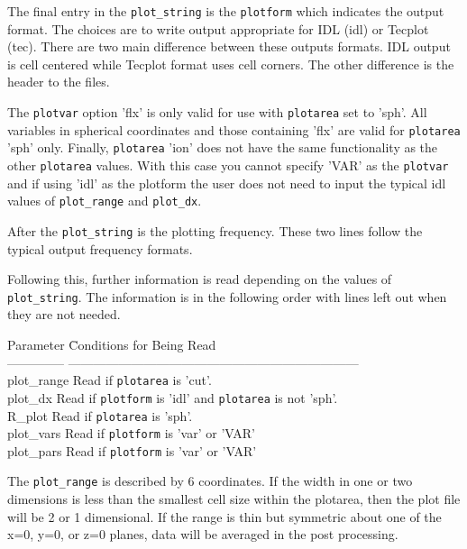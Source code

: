 The final entry in the {\tt plot\_string} is the {\tt plotform}
which indicates the output format.
The choices are to write output appropriate for IDL (idl) or Tecplot (tec).
There are two main difference between these outputs formats. IDL output is
cell centered while Tecplot format uses cell corners.  The
other difference is the header to the files.

The {\tt plotvar} option 'flx' is only valid for use with 
{\tt plotarea} set to 'sph'.  All variables in spherical 
coordinates and those containing 'flx' are valid for {\tt plotarea} 'sph' only.
Finally, {\tt plotarea} 'ion' does not have the same functionality as the other
{\tt plotarea} values.  With this case you cannot specify 'VAR' as the 
{\tt plotvar} and if using 'idl' as the plotform the user does not need to
input the typical idl values of {\tt plot\_range} and {\tt plot\_dx}.

After the {\tt plot\_string} is the plotting frequency.  These two lines
follow the typical output frequency formats.

Following this, further information is read depending on the values of 
{\tt plot\_string}.  The information is in the following order with lines
left out when they are not needed.
\begin{tabbing}
Parameter \hspace{0.5in} \= Conditions for Being Read \\
--------------              \>
--------------------------------------------------------------------- \\
plot\_range		 \> Read if {\tt plotarea} is 'cut'. \\
plot\_dx		         \> Read if {\tt plotform} is 'idl' and 
                            {\tt plotarea} is not 'sph'. \\
R\_plot		         \> Read if {\tt plotarea} is 'sph'. \\
plot\_vars		 \> Read if {\tt plotform} is 'var' or 'VAR' \\
plot\_pars		 \> Read if {\tt plotform} is 'var' or 'VAR'
\end{tabbing}

The {\tt plot\_range} is described by 6 coordinates. If the width in one or two 
dimensions is less than the smallest cell size within the plotarea, 
then the plot file will be 2 or 1 dimensional. If the range is thin but
symmetric about one of the x=0, y=0, or z=0 planes, data will be averaged
in the post processing.


